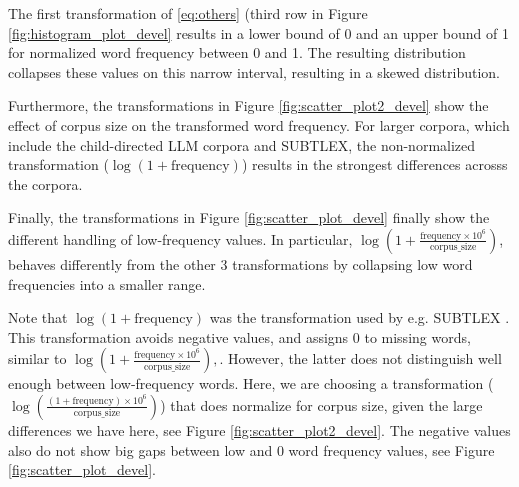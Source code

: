 \documentclass[doc, a4paper]{apa7}
\begin{document}
The first transformation of \ref{eq:others} (third row in Figure \ref{fig:histogram_plot_devel} results in a lower bound of 0 and an upper bound of 1 for normalized word frequency between 0 and 1. The resulting distribution collapses these values on this narrow interval, resulting in a skewed distribution. 

Furthermore, the transformations in Figure \ref{fig:scatter_plot2_devel} show the effect of corpus size on the transformed word frequency. For larger corpora, which include the child-directed LLM corpora and SUBTLEX, the non-normalized transformation ($\log \left( 1 + \text{frequency} \right)$) results in the strongest differences acrosss the corpora. 

Finally, the transformations in Figure \ref{fig:scatter_plot_devel} finally show the different handling of low-frequency values. In particular, $\log \left( 1 + \frac{\text{frequency} \times 10^6}{\text{corpus\_size}} \right)$, behaves differently from the other 3 transformations by collapsing low word frequencies into a smaller range. 

Note that $\log \left( 1 + \text{frequency} \right)$ was the transformation used by e.g. SUBTLEX \citep{brysbaert_word_2011}. This transformation avoids negative values, and assigns 0 to missing words, similar to $\log \left( 1 + \frac{\text{frequency} \times 10^6}{\text{corpus\_size}} \right), 
$. However, the latter does not distinguish well enough between low-frequency words. Here, we are choosing a transformation ($\log\left(\frac{(1 + \text{frequency}) \times 10^6}{\text{corpus\_size}}\right)$) that does normalize for corpus size, given the large differences we have here, see Figure \ref{fig:scatter_plot2_devel}. The negative values also do not show big gaps between low and 0 word frequency values, see Figure \ref{fig:scatter_plot_devel}. 
\end{document}
